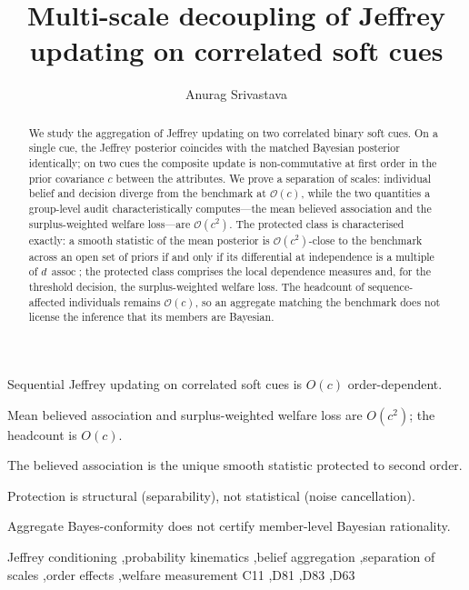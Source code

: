 \documentclass[review,12pt,authoryear]{elsarticle}
\theoremstyle{remark}
\theoremstyle{definition}
\newcommand{\assoc}{\operatorname{assoc}}
\newcommand{\bigO}{\mathcal{O}}
\begin{document}
\begin{frontmatter}

\title{Multi-scale decoupling of Jeffrey updating on correlated soft cues}

\author[rvt]{Anurag Srivastava}



\begin{abstract}
We study the aggregation of Jeffrey updating on two correlated binary soft cues. On a single
cue, the Jeffrey posterior coincides with the matched Bayesian posterior identically; on two
cues the composite update is non-commutative at first order in the prior covariance $c$ between
the attributes. We prove a separation of scales: individual belief and decision diverge from the
benchmark at $\bigO(c)$, while the two quantities a group-level audit characteristically
computes---the mean believed association and the surplus-weighted welfare loss---are
$\bigO(c^{2})$. The protected class is characterised exactly: a smooth statistic of the mean
posterior is $\bigO(c^{2})$-close to the benchmark across an open set of priors if and only if
its differential at independence is a multiple of $d\,\assoc$; the protected class comprises the
local dependence measures and, for the threshold decision, the surplus-weighted welfare loss.
The headcount of sequence-affected individuals remains $\bigO(c)$, so an aggregate matching the
benchmark does not license the inference that its members are Bayesian.
\end{abstract}

\begin{highlights}
\item Sequential Jeffrey updating on correlated soft cues is $O(c)$ order-dependent.
\item Mean believed association and surplus-weighted welfare loss are $O(c^2)$; the headcount is $O(c)$.
\item The believed association is the unique smooth statistic protected to second order.
\item Protection is structural (separability), not statistical (noise cancellation).
\item Aggregate Bayes-conformity does not certify member-level Bayesian rationality.
\end{highlights}

\begin{keyword}
Jeffrey conditioning \sep probability kinematics \sep belief aggregation \sep separation of scales \sep order effects \sep welfare measurement
\JEL C11 \sep D81 \sep D83 \sep D63
\end{keyword}

\end{frontmatter}
\end{document}
